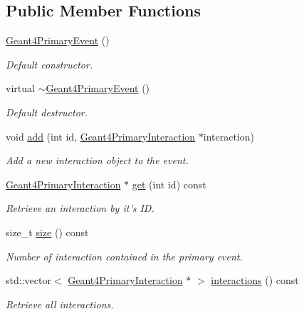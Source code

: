 \subsection*{Public Member Functions}
\begin{DoxyCompactItemize}
\item 
\hyperlink{class_d_d4hep_1_1_simulation_1_1_geant4_primary_event_aa17acb393dfaa92967d7f3f7779807cf}{Geant4PrimaryEvent} ()
\begin{DoxyCompactList}\small\item\em Default constructor. \item\end{DoxyCompactList}\item 
virtual \hyperlink{class_d_d4hep_1_1_simulation_1_1_geant4_primary_event_ab4ddee2fb079f7b48eaabd24cbe8b021}{$\sim$Geant4PrimaryEvent} ()
\begin{DoxyCompactList}\small\item\em Default destructor. \item\end{DoxyCompactList}\item 
void \hyperlink{class_d_d4hep_1_1_simulation_1_1_geant4_primary_event_ae18431e26176abdd03ddbcd4b4097605}{add} (int id, \hyperlink{class_d_d4hep_1_1_simulation_1_1_geant4_primary_interaction}{Geant4PrimaryInteraction} $\ast$interaction)
\begin{DoxyCompactList}\small\item\em Add a new interaction object to the event. \item\end{DoxyCompactList}\item 
\hyperlink{class_d_d4hep_1_1_simulation_1_1_geant4_primary_interaction}{Geant4PrimaryInteraction} $\ast$ \hyperlink{class_d_d4hep_1_1_simulation_1_1_geant4_primary_event_a52c8d1a6663c926129ba5edf4e0fb401}{get} (int id) const 
\begin{DoxyCompactList}\small\item\em Retrieve an interaction by it's ID. \item\end{DoxyCompactList}\item 
size\_\-t \hyperlink{class_d_d4hep_1_1_simulation_1_1_geant4_primary_event_a10329326a00d8bc0cd0570677677538b}{size} () const 
\begin{DoxyCompactList}\small\item\em Number of interaction contained in the primary event. \item\end{DoxyCompactList}\item 
std::vector$<$ \hyperlink{class_d_d4hep_1_1_simulation_1_1_geant4_primary_interaction}{Geant4PrimaryInteraction} $\ast$ $>$ \hyperlink{class_d_d4hep_1_1_simulation_1_1_geant4_primary_event_a332057fef57fcbec43b0c6c512e411ee}{interactions} () const 
\begin{DoxyCompactList}\small\item\em Retrieve all interactions. \item\end{DoxyCompactList}\end{DoxyCompactItemize}
